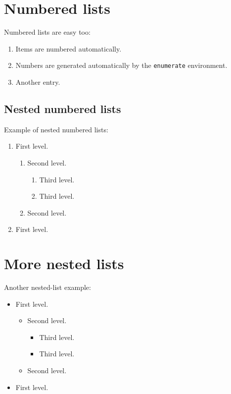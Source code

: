 \section{Numbered lists}

Numbered lists are easy too:
\begin{enumerate}
  \item Items are numbered automatically.
  \item Numbers are generated automatically by the \texttt{enumerate} environment.
  \item Another entry.
\end{enumerate}


\subsection{Nested numbered lists}

Example of nested numbered lists:
\begin{enumerate}
  \item First level.
  \begin{enumerate}
    \item Second level.
    \begin{enumerate}
      \item Third level.
      \item Third level.
    \end{enumerate}
    \item Second level.
  \end{enumerate}
  \item First level.
\end{enumerate}


\section{More nested lists}

Another nested-list example:
\begin{itemize}
  \item First level.
  \begin{itemize}
    \item Second level.
    \begin{itemize}
      \item Third level.
      \item Third level.
    \end{itemize}
    \item Second level.
  \end{itemize}
  \item First level.
\end{itemize}

